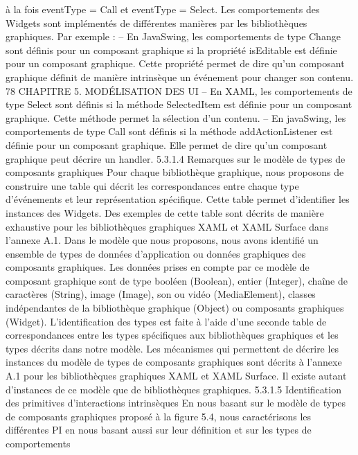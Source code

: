 \documentclass{article}
\begin{document}
\`{a} la fois eventType = Call et eventType = Select.
Les comportements des Widgets sont impl\'{e}ment\'{e}s de diff\'{e}rentes mani\`{e}res par les biblioth\`{e}ques
graphiques. Par exemple :
– En JavaSwing, les comportements de type Change sont d\'{e}ﬁnis pour un composant graphique
si la propri\'{e}t\'{e} isEditable est d\'{e}ﬁnie pour un composant graphique. Cette propri\'{e}t\'{e} permet de
dire qu’un composant graphique d\'{e}ﬁnit de mani\`{e}re intrins\`{e}que un \'{e}v\'{e}nement pour changer son
contenu.
78
CHAPITRE 5. MODÉLISATION DES UI
– En XAML, les comportements de type Select sont d\'{e}ﬁnis si la m\'{e}thode SelectedItem est d\'{e}ﬁnie
pour un composant graphique. Cette m\'{e}thode permet la s\'{e}lection d’un contenu.
– En javaSwing, les comportements de type Call sont d\'{e}ﬁnis si la m\'{e}thode addActionListener
est d\'{e}ﬁnie pour un composant graphique. Elle permet de dire qu’un composant graphique peut
d\'{e}crire un handler.
5.3.1.4
Remarques sur le mod\`{e}le de types de composants graphiques
Pour chaque biblioth\`{e}que graphique, nous proposons de construire une table qui d\'{e}crit les correspondances entre chaque type d’\'{e}v\'{e}nements et leur repr\'{e}sentation sp\'{e}ciﬁque. Cette table permet
d’identiﬁer les instances des Widgets. Des exemples de cette table sont d\'{e}crits de mani\`{e}re exhaustive
pour les biblioth\`{e}ques graphiques XAML et XAML Surface dans l’annexe A.1.
Dans le mod\`{e}le que nous proposons, nous avons identiﬁ\'{e} un ensemble de types de donn\'{e}es d’application ou donn\'{e}es graphiques des composants graphiques. Les donn\'{e}es prises en compte par ce
mod\`{e}le de composant graphique sont de type bool\'{e}en (Boolean), entier (Integer), cha\^{i}ne de caract\`{e}res (String), image (Image), son ou vid\'{e}o (MediaElement), classes ind\'{e}pendantes de la biblioth\`{e}que
graphique (Object) ou composants graphiques (Widget). L’identiﬁcation des types est faite \`{a} l’aide
d’une seconde table de correspondances entre les types sp\'{e}ciﬁques aux biblioth\`{e}ques graphiques et
les types d\'{e}crits dans notre mod\`{e}le.
Les m\'{e}canismes qui permettent de d\'{e}crire les instances du mod\`{e}le de types de composants graphiques sont d\'{e}crits \`{a} l’annexe A.1 pour les biblioth\`{e}ques graphiques XAML et XAML Surface. Il
existe autant d’instances de ce mod\`{e}le que de biblioth\`{e}ques graphiques.
5.3.1.5
Identiﬁcation des primitives d’interactions intrins\`{e}ques
En nous basant sur le mod\`{e}le de types de composants graphiques propos\'{e} \`{a} la ﬁgure 5.4, nous caract\'{e}risons les diff\'{e}rentes PI en nous basant aussi sur leur d\'{e}ﬁnition et sur les types de comportements
\end{document}
